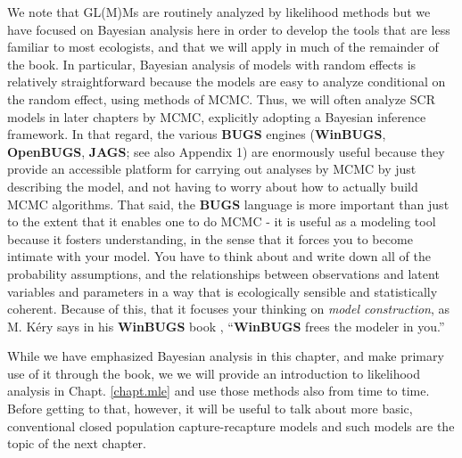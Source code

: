 We note that GL(M)Ms are routinely
analyzed by likelihood methods but we have focused on Bayesian
analysis here in order to develop the tools that are less familiar to
most ecologists, and that we will apply in much of the remainder of the book.  In particular, Bayesian analysis of models with random
effects is relatively straightforward because the models
are easy to analyze conditional on the random effect, using methods of
MCMC.  Thus, we will often analyze SCR models in later chapters by
MCMC, explicitly adopting a Bayesian inference framework.
In that regard, the various {\bf BUGS} engines ({\bf WinBUGS}, {\bf
  OpenBUGS}, {\bf JAGS}; see also Appendix 1) are enormously useful because they
provide an accessible platform for
carrying out  analyses by MCMC by just
describing the model, and not having to worry about how to actually
build MCMC algorithms.  That said, the {\bf BUGS} language is more important
than just to the extent that it enables one to do MCMC - it is useful
as a modeling tool because it fosters understanding, in the sense that
it forces you to become intimate with your model. You have to think
about and write
down all of the probability assumptions, and the relationships between
observations and latent variables and parameters in a way that is
ecologically sensible and statistically coherent. Because of this,
that it focuses your thinking on {\it model construction}, 
as M. K\'{e}ry says
in his {\bf WinBUGS} book \citep{kery:2010}, ``{\bf WinBUGS}   frees
the modeler in you.''


While we have emphasized Bayesian analysis in this chapter, and make
primary use of it through the book, we
we will provide an introduction to likelihood analysis in Chapt.
\ref{chapt.mle} and use those  methods also from time to time.
 Before getting to that, however, it will be useful to
talk about more basic, conventional closed population
capture-recapture models and such models are the topic of the next chapter.
